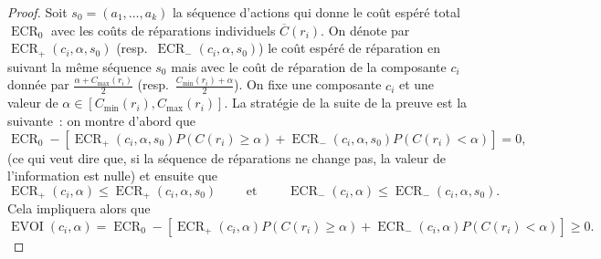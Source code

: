 \documentclass[a4paper,11pt]{article}
\theoremstyle{plain}
\theoremstyle{definition}
\DeclareMathOperator{\ECR}{ECR}
\DeclareMathOperator{\EVOI}{EVOI}
\begin{document}
\begin{proof}
Soit $s_0 = (a_1, \dotsc, a_k)$ la séquence d'actions qui donne le coût espéré total $\ECR_0$ avec les coûts de réparations individuels $\overline C(r_i)$. On dénote par $\ECR_+(c_i, \alpha, s_0)$ (resp.\ $\ECR_-(c_i, \alpha, s_0)$) le coût espéré de réparation en suivant la même séquence $s_0$ mais avec le coût de réparation de la composante $c_i$ donnée par $\frac{\alpha + C_{\max}(r_i)}{2}$ (resp.\ $\frac{C_{\min}(r_i) + \alpha}{2}$). On fixe une composante $c_i$ et une valeur de $\alpha \in [C_{\min}(r_i), C_{\max}(r_i)]$. La stratégie de la suite de la preuve est la suivante~: on montre d'abord que
\begin{equation}
\label{ProofEVOIFirstPart}
\ECR_0 - \left[\ECR_+(c_i, \alpha, s_0) P(C(r_i) \geq \alpha) + \ECR_-(c_i, \alpha, s_0) P(C(r_i) < \alpha)\right] = 0,
\end{equation}
(ce qui veut dire que, si la séquence de réparations ne change pas, la valeur de l'information est nulle) et ensuite que
\begin{equation}
\label{ProofEVOISecondPart}
\ECR_+(c_i, \alpha) \leq \ECR_+(c_i, \alpha, s_0) \qquad \text{ et } \qquad \ECR_-(c_i, \alpha) \leq \ECR_-(c_i, \alpha, s_0).
\end{equation}
Cela impliquera alors que
\[
\EVOI(c_i, \alpha) = \ECR_0 - \left[\ECR_+(c_i, \alpha) P(C(r_i) \geq \alpha) + \ECR_-(c_i, \alpha) P(C(r_i) < \alpha)\right] \geq 0.
\]


\end{proof}
\end{document}
